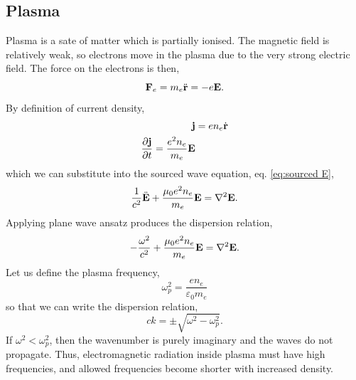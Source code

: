 \documentclass{book}
\begin{document}
\subsection{Plasma}
Plasma is a sate of matter which is partially ionised. The magnetic field is relatively weak, so electrons move in the plasma due to the very strong electric field. The force on the electrons is then,
\begin{equation}
	\vb{F}_e = m_e \Ddot{\vb{r}} = - e \vb{E}.
\end{equation}
By definition of current density,
\begin{align}
	\vb{j} & = en_e \Dot{\vb{r}} \\
	\pdv{\vb{j}}{t} = \frac{e^2n_e}{m_e}\vb{E}
\end{align}
which we can substitute into the sourced wave equation, eq. \eqref{eq:sourced E}, 
\begin{equation}
	\frac{1}{c^2}\Ddot{\vb{E}} + \frac{\mu_0 e^2n_e}{m_e} \vb{E} = \laplacian\vb{E}.
\end{equation}
Applying plane wave ansatz produces the dispersion relation,
\begin{equation}
	-\frac{\omega^2}{c^2} + \frac{\mu_0e^2n_e}{m_e}\vb{E} = \laplacian{\vb{E}}.
\end{equation}
Let us define the plasma frequency,
\begin{equation}
	\omega_p^2 = \frac{en_e}{\varepsilon_0 m_e}
\end{equation}
so that we can write the dispersion relation,
\begin{equation}
	ck = \pm \sqrt{\omega^2 - \omega_p^2}.
\end{equation}
If $\omega^2 < \omega_p^2$, then the wavenumber is purely imaginary and the waves do not propagate. Thus, electromagnetic radiation inside plasma must have high frequencies, and allowed frequencies become shorter with increased density.
\end{document}
